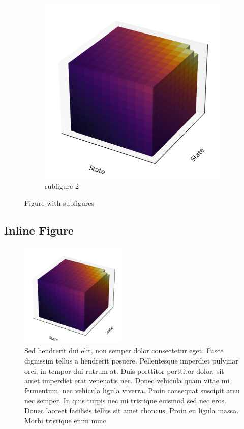 \begin{figure}[htb]
\begin{subfigure}[t]{0.20\textwidth}
        \includegraphics[width=\textwidth]{assets/3d.png}
        \caption{rubfigure 2}
    \end{subfigure}
    \caption{Figure with subfigures}
\end{figure}

\clearpage

\subsection{Inline Figure}

\begin{figure}
    \centering
    \includegraphics[width=0.45\textwidth]{assets/3d.png}
    \caption[Alternate Figure Title]{Sed hendrerit dui elit, non semper dolor consectetur eget. Fusce dignissim tellus a hendrerit posuere. Pellentesque imperdiet pulvinar orci, in tempor dui rutrum at. Duis porttitor porttitor dolor, sit amet imperdiet erat venenatis nec. Donec vehicula quam vitae mi fermentum, nec vehicula ligula viverra. Proin consequat suscipit arcu nec semper. In quis turpis nec mi tristique euismod sed nec eros. Donec laoreet facilisis tellus sit amet rhoncus. Proin eu ligula massa. Morbi tristique enim nunc}
    \label{fig:inline}
\end{figure}

